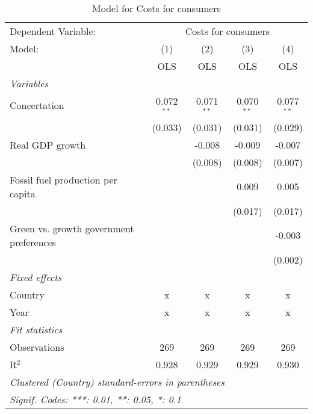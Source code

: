 
\begin{table}[htbp]
   \caption{Model for Costs for consumers}
   \centering
   \begin{tabular}{lcccc}
      \toprule
      Dependent Variable: & \multicolumn{4}{c}{Costs for consumers}\\
      Model:                                  & (1)          & (2)          & (3)          & (4)\\  
                                              &  OLS         & OLS          & OLS          & OLS\\  
      \midrule
      \emph{Variables}\\
      Concertation                            & 0.072$^{**}$ & 0.071$^{**}$ & 0.070$^{**}$ & 0.077$^{**}$\\   
                                              & (0.033)      & (0.031)      & (0.031)      & (0.029)\\   
      Real GDP growth                         &              & -0.008       & -0.009       & -0.007\\   
                                              &              & (0.008)      & (0.008)      & (0.007)\\   
      Fossil fuel production per capita       &              &              & 0.009        & 0.005\\   
                                              &              &              & (0.017)      & (0.017)\\   
      Green vs. growth government preferences &              &              &              & -0.003\\   
                                              &              &              &              & (0.002)\\   
      \emph{Fixed effects}\\
      Country                                 & x            & x            & x            & x\\  
      Year                                    & x            & x            & x            & x\\  
      \midrule \emph{Fit statistics}\\
      Observations                            & 269          & 269          & 269          & 269\\  
      R$^2$                                   & 0.928        & 0.929        & 0.929        & 0.930\\  
      \midrule
      \multicolumn{5}{l}{\emph{Clustered (Country) standard-errors in parentheses}}\\
      \multicolumn{5}{l}{\emph{Signif. Codes: ***: 0.01, **: 0.05, *: 0.1}}\\
   \end{tabular}
\end{table}


